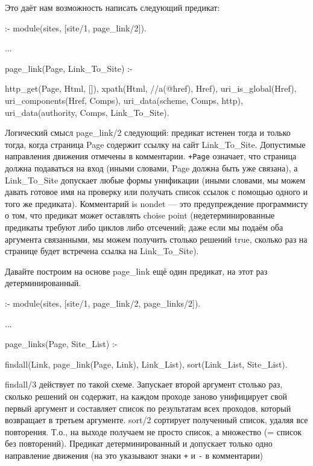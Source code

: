 \documentclass[a4paper]{book}
\def\To{Т.\thinspace о.}
\begin{document}
Это даёт нам возможность написать следующий предикат:

\begin{example}{}{}
:- module(sites, [site/1, page_link/2]).

...

page_link(Page, Link_To_Site) :-

   http_get(Page, Html, []),
   xpath(Html, //a(@href), Href), 
   uri_is_global(Href), uri_components(Href, Comps), 
   uri_data(scheme, Comps, http), %
   uri_data(authority, Comps, Link_To_Site).
\end{example}

Логический смысл page_link/2 следующий: предикат истенен тогда и
только тогда, когда страница Page содержит ссылку на сайт
Link_To_Site. Допустимые направления движения отмечены в
комментарии. \verb|+Page| означает, что страница должна
подаваться на вход (иными словами, Page должна быть уже связана),
а Link_To_Site допускает любые формы унификации (иными словами,
мы можем давать готовое имя на проверку или получать список
ссылок с помощью одного и того же предиката). Комментарий is
nondet --- это предупреждение программисту о том, что предикат
может оставлять choise point (недетерминированные предикаты
требуют либо циклов либо отсечений; даже если мы подаём оба
аргумента связанными, мы можем получить столько решений true,
сколько раз на странице будет встречена ссылка на Link_To_Site).

Давайте построим на основе page_link ещё один предикат, на этот
раз детерминированный.

\begin{example}{}{}
:- module(sites, [site/1, page_link/2, page_links/2]).

...

page_links(Page, Site_List) :-

  findall(Link, page_link(Page, Link), Link_List),
  sort(Link_List, Site_List).
\end{example}

findall/3 действует по такой схеме. Запускает второй аргумент
столько раз, сколько решений он содержит, на каждом проходе
заново унифицирует свой первый аргумент и составляет список по
результатам всех проходов, который возвращает в третьем
аргументе. sort/2 сортирует полученный список, удаляя все
повторения. \To, на выходе получаем не просто список, а
множество (= список без повторений). Предикат детерминированный и
допускает только одно направление движения (на это указывают
знаки \verb|+| и \verb|-| в комментарии)
\end{document}
